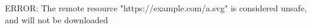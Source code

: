 ERROR: The remote resource "https://example.com/a.svg" is considered unsafe, and will not be downloaded
